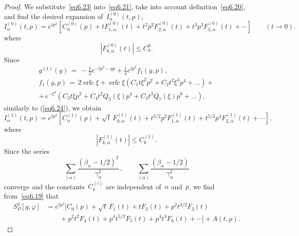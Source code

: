 \documentclass{amsart}
\theoremstyle{plain}
\theoremstyle{definition}
\numberwithin{equation}{section}
\begin{document}
\begin{proof}
We substitute~\eqref{eq6.23} into~\eqref{eq6.21}, take into account
definition~\eqref{eq6.20}, and find the desired expansion
of~$I_\alpha^{(0)}(t,p)$,
\begin{equation}
\label{eq6.24}
I_\alpha^{(0)}(t,p)=e^{tp^2}[C_\alpha^{(0)}(p)+tF_{1,\alpha}^{(0)}(t)+
t^2p^2F_{2,\alpha}^{(0)}(t)+t^3p^3F_{3,\alpha}^{(0)}(t)+\cdots]\qquad
(t \to 0).
\end{equation}
where
\begin{equation}
\label{eq6.25}
|F_{k,\alpha}^{(0)}(t)| \leqslant C_k^0.
\end{equation}
Since
\begin{multline}
\label{eq6.26}
g^{(1)}(y)\,=\,-\frac{1}{2}e^{-tp^{2}-yp}+\frac{1}{4}e^{tp^{2}}f_{1}(y,p),\\
f_{1}(y,p)\,=\,2\operatorname{erfc}\xi+\operatorname{erfc}\xi(C_{1}t\xi^{2}p^{2}+C_{2}t^{2}\xi^{4}p^{4}+\ldots)+\\
+\,e^{-\xi^{2}}(C_{3}t\xi p^{2}+C_{4}t^{2}Q_{5}(\xi)p^{4}+C_{3}t^{3}Q_{7}(\xi)p^{6} +\ldots),
\end{multline}
similarly to (\ref{eq6.24}), we obtain
\begin{equation}
\label{eq6.27} I_\alpha^{(1)}(t,p)=e^{tp^2}[C_\alpha^{(1)}(p)+
\sqrt{t}\,F_{0,\alpha}^{(1)}(t)+t^{3/2}p^2F_{1,\alpha}^{(1)}(t)+
t^{5/2}p^4F_{2,\alpha}^{(1)}(t)+\cdots],
\end{equation}
where
\begin{equation}
\label{eq6.28}
|F_{k,\alpha}^{(1)}(t)| \leqslant C_k^{(1)}.
\end{equation}
Since the series
$$
\sum_{(\alpha)}\frac{(\beta_\alpha-1/2)^2}{\gamma_\alpha^2}\,,\qquad
\sum_{(\alpha)}\frac{(\beta_\alpha-1/2)}{\gamma_\alpha^2}
$$
converge and the constants~$C_k^{(i)}$ are independent of~$\alpha$
and~$p$, we find from~\eqref{eq6.19} that
\begin{align}
\nonumber
S_P^3[g,\varphi]&=e^{tp^2}[C_0(p)+\sqrt{t}\,F_{1}(t)+
tF_{2}(t)+p^2t^{3/2}F_{3}(t)
\\
\label{eq6.29}
&\qquad+p^2t^2F_{4}(t)+p^4t^{5/2}F_{5}(t)+p^4t^3F_{6}(t)+\cdots]+A(t,p).
\end{align}


\end{proof}
\end{document}
